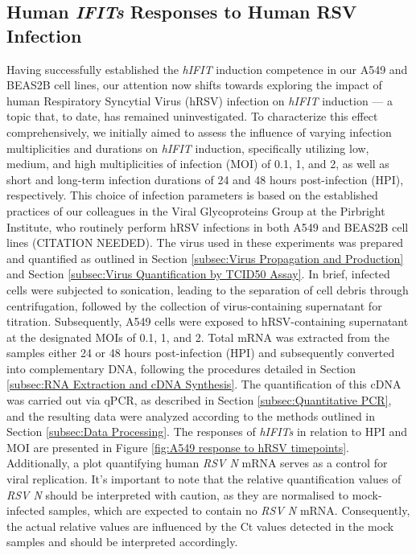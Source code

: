 \subsection{Human \textit{IFITs} Responses to Human RSV Infection} \label{subsec:Human IFITs Responses to Human RSV}
Having successfully established the \textit{hIFIT} induction competence in our A549 and BEAS2B cell lines, our attention now shifts towards exploring the impact of human Respiratory Syncytial Virus (hRSV) infection on \textit{hIFIT} induction — a topic that, to date, has remained uninvestigated. To characterize this effect comprehensively, we initially aimed to assess the influence of varying infection multiplicities and durations on \textit{hIFIT} induction, specifically utilizing low, medium, and high multiplicities of infection (MOI) of 0.1, 1, and 2, as well as short and long-term infection durations of 24 and 48 hours post-infection (HPI), respectively. This choice of infection parameters is based on the established practices of our colleagues in the Viral Glycoproteins Group at the Pirbright Institute, who routinely perform hRSV infections in both A549 and BEAS2B cell lines (CITATION NEEDED). The virus used in these experiments was prepared and quantified as outlined in Section \ref{subsec:Virus Propagation and Production} and Section \ref{subsec:Virus Quantification by TCID50 Assay}. In brief, infected cells were subjected to sonication, leading to the separation of cell debris through centrifugation, followed by the collection of virus-containing supernatant for titration. Subsequently, A549 cells were exposed to hRSV-containing supernatant at the designated MOIs of 0.1, 1, and 2. Total mRNA was extracted from the samples either 24 or 48 hours post-infection (HPI) and subsequently converted into complementary DNA, following the procedures detailed in Section \ref{subsec:RNA Extraction and cDNA Synthesis}. The quantification of this cDNA was carried out via qPCR, as described in Section \ref{subsec:Quantitative PCR}, and the resulting data were analyzed according to the methods outlined in Section \ref{subsec:Data Processing}. The responses of \textit{hIFITs} in relation to HPI and MOI are presented in Figure \ref{fig:A549 response to hRSV timepoints}. Additionally, a plot quantifying human \textit{RSV N} mRNA serves as a control for viral replication. It's important to note that the relative quantification values of \textit{RSV N} should be interpreted with caution, as they are normalised to mock-infected samples, which are expected to contain no \textit{RSV N} mRNA. Consequently, the actual relative values are influenced by the Ct values detected in the mock samples and should be interpreted accordingly.

